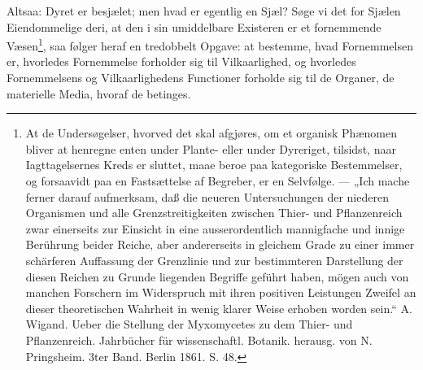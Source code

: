 \documentclass[11pt]{book}
\newcommand{\opage}[1]{\marginnote{\footnotesize\textit{[#1]}}}
\begin{document}
Altsaa: Dyret er besjælet; men hvad er egentlig en Sjæl? Søge vi det for
Sjælen Eiendommelige deri, at den i sin umiddelbare Existeren er et
fornemmende Væsen\footnote{%
At de Undersøgelser, hvorved det skal afgjøres, om et organisk Phænomen
bliver at henregne enten under Plante- eller under Dyreriget, tilsidst, naar
Iagttagelsernes Kreds er sluttet, maae beroe paa kategoriske Bestemmelser, og
forsaavidt paa en Fastsættelse af Begreber, er en Selvfølge. --- „Ich mache
ferner darauf aufmerksam, daß die neueren Untersuchungen der niederen
Organismen und alle Grenzstreitigkeiten zwischen Thier- und Pflanzenreich
zwar einerseits zur Einsicht in eine ausserordentlich mannigfache und innige
Berührung beider Reiche, aber andererseits in gleichem Grade zu einer immer
schärferen Auffassung der Grenzlinie und zur bestimmteren Darstellung der
diesen Reichen zu Grunde liegenden Begriffe geführt haben, mögen auch von
manchen Forschern im Widerspruch mit ihren positiven Leistungen Zweifel an
dieser theoretischen Wahrheit in wenig klarer Weise erhoben worden sein.“
A. Wigand. Ueber die Stellung der Myxomycetes zu dem Thier- und
Pflanzenreich. Jahrbücher für wissenschaftl. Botanik. herausg. von
N. Pringsheim. 3ter Band. Berlin 1861. S. 48.}, saa følger heraf en
tredobbelt Opgave: at bestemme, hvad Fornemmelsen er, hvorledes Fornemmelse
forholder sig til Vilkaarlighed, og hvorledes Fornemmelsens og
Vilkaarlighedens
\opage{331} \setcounter{footnote}{0}%
Functioner forholde sig til de Organer, de materielle Media, hvoraf de
betinges.
\end{document}
